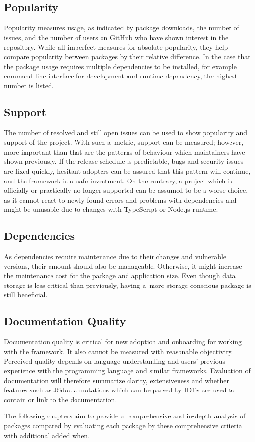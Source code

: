 \subsection{Popularity}

Popularity measures usage, as indicated by package downloads, the number of
issues, and the number of users on GitHub who have shown interest in the
repository. While all imperfect measures for absolute popularity, they help
compare popularity between packages by their relative difference. In the case
that the package usage requires multiple dependencies to be installed, for
example command line interface for development and runtime dependency, the
highest number is listed.

\subsection{Support}

The number of resolved and still open issues can be used to show popularity and
support of the project. With such a~metric, support can be measured; however,
more important than that are the patterns of behaviour which maintainers have
shown previously. If the release schedule is predictable, bugs and security
issues are fixed quickly, hesitant adopters can be assured that this pattern
will continue, and the framework is a~safe investment. On the contrary, a
project which is officially or practically no longer supported can be assumed to
be a worse choice, as it cannot react to newly found errors and problems with
dependencies and might be unusable due to changes with TypeScript or Node.js
runtime.

\subsection{Dependencies}

As dependencies require maintenance due to their changes and vulnerable
versions, their amount should also be manageable. Otherwise, it might increase
the maintenance cost for the package and application size. Even though data
storage is less critical than previously, having a~more storage-conscious
package is still beneficial.

\subsection{Documentation Quality}

Documentation quality is critical for new adoption and onboarding for working
with the framework. It also cannot be measured with reasonable objectivity.
Perceived quality depends on language understanding and users’ previous
experience with the programming language and similar frameworks. Evaluation of
documentation will therefore summarize clarity, extensiveness and whether
features such as JSdoc annotations \cite{Typescript-jsdoc} which can be parsed
by IDEs are used to contain or link to the documentation.


The following chapters aim to provide a~comprehensive and in-depth analysis of
packages compared by evaluating each package by these comprehensive criteria
with additional added when.

